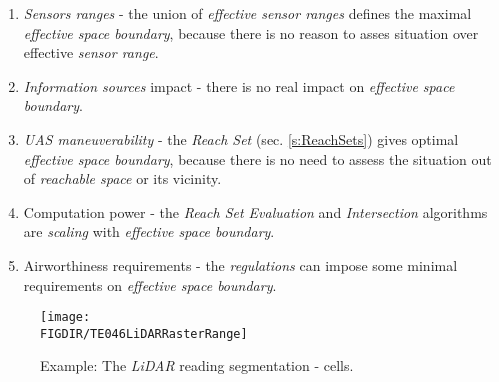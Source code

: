 \begin{enumerate}
        \item \emph{Sensors ranges} - the union of \emph{effective sensor ranges} defines the maximal \emph{effective space boundary}, because there is no reason to asses situation over effective \emph{sensor range}.
        
        \item \emph{Information sources} impact - there is no real impact on \emph{effective space boundary}.
        
        \item \emph{UAS maneuverability} - the \emph{Reach Set} (sec. \ref{s:ReachSets}) gives optimal \emph{effective space boundary}, because there is no need to assess the situation out of \emph{reachable space} or its vicinity. 
        
        \item Computation power - the \emph{Reach Set Evaluation} and \emph{Intersection} algorithms are \emph{scaling} with \emph{effective space boundary}.
        
        \item Airworthiness requirements - the \emph{regulations} can impose some minimal requirements on \emph{effective space boundary}.
\end{enumerate}

\begin{figure}[H]
    \centering
    \texttt{[image: \\FIGDIR/TE046LiDARRasterRange]} 
    \caption{Example: The \emph{LiDAR} reading segmentation - cells.}
    \label{fig:LidarSpaceSegmentation}
\end{figure}

